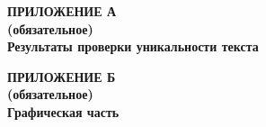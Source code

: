 \newpage


\newpage

\begin{center}
\textbf{
\MakeUppercase{Приложение А}\\
(обязательное)\\
Результаты проверки уникальности текста}
\end{center}

\pagestyle{empty}

\newpage
\pagestyle{fancy}



\begin{center}
\textbf{
\MakeUppercase{Приложение Б}\\
(обязательное)\\
Графическая часть}
\end{center}
